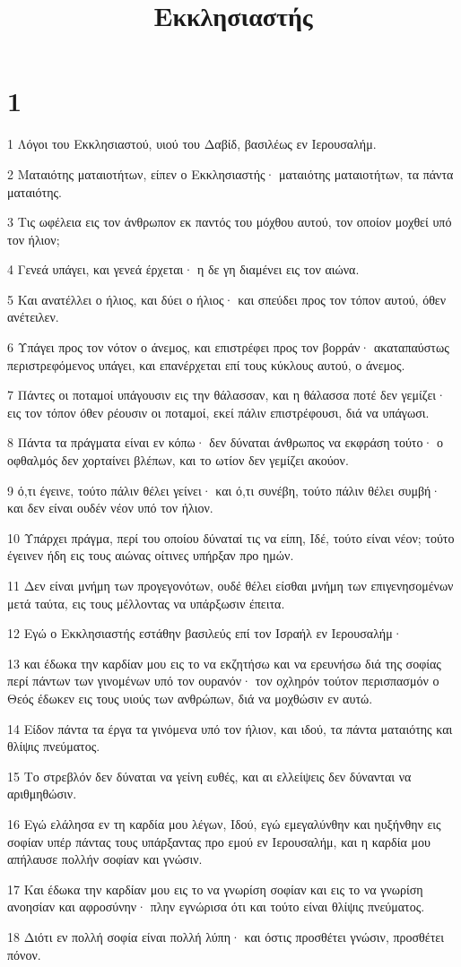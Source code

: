 

\title{Εκκλησιαστής}


\chapter{1}

\par 1 Λόγοι του Εκκλησιαστού, υιού του Δαβίδ, βασιλέως εν Ιερουσαλήμ.
\par 2 Ματαιότης ματαιοτήτων, είπεν ο Εκκλησιαστής· ματαιότης ματαιοτήτων, τα πάντα ματαιότης.
\par 3 Τις ωφέλεια εις τον άνθρωπον εκ παντός του μόχθου αυτού, τον οποίον μοχθεί υπό τον ήλιον;
\par 4 Γενεά υπάγει, και γενεά έρχεται· η δε γη διαμένει εις τον αιώνα.
\par 5 Και ανατέλλει ο ήλιος, και δύει ο ήλιος· και σπεύδει προς τον τόπον αυτού, όθεν ανέτειλεν.
\par 6 Υπάγει προς τον νότον ο άνεμος, και επιστρέφει προς τον βορράν· ακαταπαύστως περιστρεφόμενος υπάγει, και επανέρχεται επί τους κύκλους αυτού, ο άνεμος.
\par 7 Πάντες οι ποταμοί υπάγουσιν εις την θάλασσαν, και η θάλασσα ποτέ δεν γεμίζει· εις τον τόπον όθεν ρέουσιν οι ποταμοί, εκεί πάλιν επιστρέφουσι, διά να υπάγωσι.
\par 8 Πάντα τα πράγματα είναι εν κόπω· δεν δύναται άνθρωπος να εκφράση τούτο· ο οφθαλμός δεν χορταίνει βλέπων, και το ωτίον δεν γεμίζει ακούον.
\par 9 ό,τι έγεινε, τούτο πάλιν θέλει γείνει· και ό,τι συνέβη, τούτο πάλιν θέλει συμβή· και δεν είναι ουδέν νέον υπό τον ήλιον.
\par 10 Υπάρχει πράγμα, περί του οποίου δύναταί τις να είπη, Ιδέ, τούτο είναι νέον; τούτο έγεινεν ήδη εις τους αιώνας οίτινες υπήρξαν προ ημών.
\par 11 Δεν είναι μνήμη των προγεγονότων, ουδέ θέλει είσθαι μνήμη των επιγενησομένων μετά ταύτα, εις τους μέλλοντας να υπάρξωσιν έπειτα.
\par 12 Εγώ ο Εκκλησιαστής εστάθην βασιλεύς επί τον Ισραήλ εν Ιερουσαλήμ·
\par 13 και έδωκα την καρδίαν μου εις το να εκζητήσω και να ερευνήσω διά της σοφίας περί πάντων των γινομένων υπό τον ουρανόν· τον οχληρόν τούτον περισπασμόν ο Θεός έδωκεν εις τους υιούς των ανθρώπων, διά να μοχθώσιν εν αυτώ.
\par 14 Είδον πάντα τα έργα τα γινόμενα υπό τον ήλιον, και ιδού, τα πάντα ματαιότης και θλίψις πνεύματος.
\par 15 Το στρεβλόν δεν δύναται να γείνη ευθές, και αι ελλείψεις δεν δύνανται να αριθμηθώσιν.
\par 16 Εγώ ελάλησα εν τη καρδία μου λέγων, Ιδού, εγώ εμεγαλύνθην και ηυξήνθην εις σοφίαν υπέρ πάντας τους υπάρξαντας προ εμού εν Ιερουσαλήμ, και η καρδία μου απήλαυσε πολλήν σοφίαν και γνώσιν.
\par 17 Και έδωκα την καρδίαν μου εις το να γνωρίση σοφίαν και εις το να γνωρίση ανοησίαν και αφροσύνην· πλην εγνώρισα ότι και τούτο είναι θλίψις πνεύματος.
\par 18 Διότι εν πολλή σοφία είναι πολλή λύπη· και όστις προσθέτει γνώσιν, προσθέτει πόνον.

